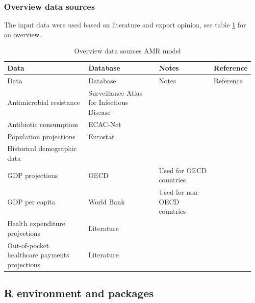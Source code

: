 \documentclass[
]{article}
\begin{document}
\hypertarget{overview-data-sources-2}{%
\subsubsection{Overview data sources}\label{overview-data-sources-2}}

The input data were used based on literature \autocite{hashiguchiResistanceProportionsEight2019} and export opinion, see table \ref{tab:amr-ref} for an overview.

\begin{longtable}[]{@{}
  >{\raggedright\arraybackslash}p{}
  >{\raggedright\arraybackslash}p{}
  >{\raggedright\arraybackslash}p{}
  >{\raggedright\arraybackslash}p{}@{}}
\caption{\label{tab:amr-ref} Overview data sources AMR model}\tabularnewline
\toprule
Data & Database & Notes & Reference \\
\midrule
\endfirsthead
\toprule
Data & Database & Notes & Reference \\
\midrule
\endhead
Antimicrobial resistance & Surveillance Atlas for Infectious Disease & & \autocite{europeancentrefordiseasepreventionandcontrolAntimicrobialResistance2021} \\
Antibiotic consumption & ECAC-Net & & \autocite{europeancentrefordiseasepreventionandcontrolAntimicrobialConsumptionDatabase} \\
Population projections & Eurostat & & \autocite{eurostatPopulation1stJanuary2021} \\
Historical demographic data & & & \autocite{eurostatPopulationJanuaryAge2021} \\
GDP projections & OECD & Used for OECD countries & \autocite{oecdLongtermBaselineProjections2018} \\
GDP per capita & World Bank & Used for non-OECD countries & \autocite{theworldbankGDPCapitaPPP} \\
Health expenditure projections & Literature & & \autocite{changPresentFutureGlobal2019} \\
Out-of-pocket healthcare payments projections & Literature & & \autocite{changPresentFutureGlobal2019} \\
\bottomrule
\end{longtable}

\hypertarget{r-environment-and-packages}{%
\subsection{R environment and packages}\label{r-environment-and-packages}}
\end{document}
